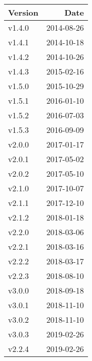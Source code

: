 \begin{tabular}{lr}
	\toprule
	Version & Date \\
	\midrule
v1.4.0 & 2014-08-26\\
v1.4.1 & 2014-10-18\\
v1.4.2 & 2014-10-26\\
v1.4.3 & 2015-02-16\\
v1.5.0 & 2015-10-29\\
v1.5.1 & 2016-01-10\\
v1.5.2 & 2016-07-03\\
v1.5.3 & 2016-09-09\\
v2.0.0 & 2017-01-17\\
v2.0.1 & 2017-05-02\\
v2.0.2 & 2017-05-10\\
v2.1.0 & 2017-10-07\\
v2.1.1 & 2017-12-10\\
v2.1.2 & 2018-01-18\\
v2.2.0 & 2018-03-06\\
v2.2.1 & 2018-03-16\\
v2.2.2 & 2018-03-17\\
v2.2.3 & 2018-08-10\\
v3.0.0 & 2018-09-18\\
v3.0.1 & 2018-11-10\\
v3.0.2 & 2018-11-10\\
v3.0.3 & 2019-02-26\\
v2.2.4 & 2019-02-26\\
	\bottomrule
\end{tabular}
